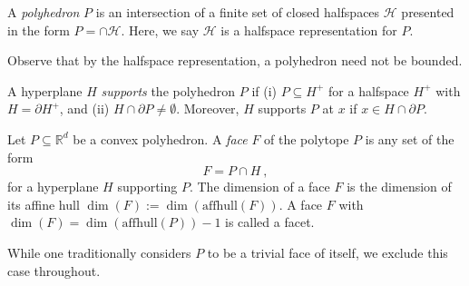 \documentclass[twoside,11pt]{article}
\newcommand{\Comments}{1}
\newcommand{\mytodo}[2]{\ifnum\Comments=1%
  \todo[linecolor=#1!80!black,backgroundcolor=#1,bordercolor=#1!80!black]{#2}\fi}
\newcommand{\raft}[1]{\mytodo{green!20!white}{RF: #1}}
\newcommand{\reals}{\mathbb{R}}
\newcommand{\affhull}{\mathrm{affhull}}
\renewcommand{\H}{\mathcal{H}}
\newcommand{\inprod}[2]{\langle #1, #2 \rangle}%
\newtheorem{claim}{Claim}
\begin{document}
\begin{definition}
	A \emph{polyhedron} $P$ is an intersection of a finite set of closed halfspaces $\H$
  presented in the form $P = \cap \H$.
  Here, we say $\H$ is a halfspace representation for $P$.
\end{definition}

\noindent
Observe that by the halfspace representation, a polyhedron need not be bounded.


\begin{definition}[Supports]
	A hyperplane $H$ \emph{supports} the polyhedron $P$ if 
	(i) $P \subseteq H^+$ for a halfspace $H^+$ with $H = \partial H^+$, and
	(ii) $H \cap \partial P \neq \emptyset$.
	Moreover, $H$ supports $P$ at $x$ if $x \in H \cap \partial P$.
\end{definition}


\begin{definition}\label{def:face}
  Let $P \subseteq \reals^d$ be a convex polyhedron.
  A \emph{face} $F$ of the polytope $P$ is any set of the form
  \begin{equation*}
    F = P \cap H~,
  \end{equation*}
  for a hyperplane $H$ supporting $P$.
  The dimension of a face $F$ is the dimension of its affine hull $\dim(F) := \dim(\affhull(F))$.
  A face $F$ with $\dim(F) = \dim(\affhull(P)) - 1$ is called a facet.
\end{definition}

While one traditionally considers $P$ to be a trivial face of itself, we exclude this case throughout.

\end{document}
